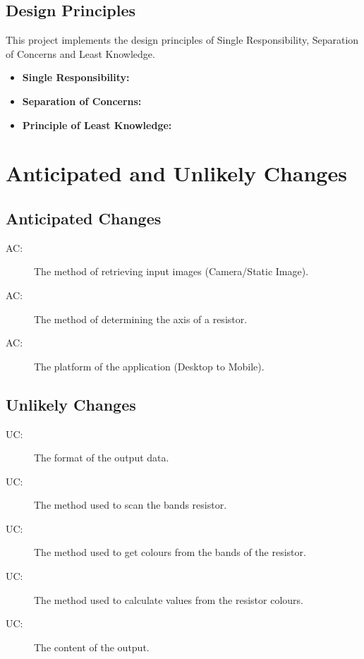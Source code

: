 \documentclass[12pt, titlepage]{article}
\newcounter{acnum}
\newcommand{\actheacnum}{AC\theacnum}
\newcounter{ucnum}
\newcommand{\uctheucnum}{UC\theucnum}
\begin{document}
\subsection{Design Principles}
This project implements the design principles of Single Responsibility, Separation of Concerns and Least Knowledge.
\begin{itemize}
\item \textbf{Single Responsibility:} 
\item \textbf{Separation of Concerns:}
\item \textbf{Principle of Least Knowledge:}
\end{itemize}

\section{Anticipated and Unlikely Changes} \label{SecChange}

\subsection{Anticipated Changes} \label{SecAchange}
\begin{description}
\item[ \actheacnum \label{acInput}:] The method of retrieving input images (Camera/Static Image).
\item[ \actheacnum \label{acAxis}:] The method of determining the axis of a resistor.
\item[ \actheacnum \label{acPlatform}:] The platform of the application (Desktop to Mobile).
\end{description}

\subsection{Unlikely Changes} \label{SecUchange}
\begin{description}
\item[ \uctheucnum \label{ucIO}:] The format of the output data.
\item[ \uctheucnum \label{ucInput}:] The method used to scan the bands resistor.
\item[ \uctheucnum \label{ucInput}:] The method used to get colours from the bands of the resistor.
\item[ \uctheucnum \label{ucInput}:] The method used to calculate values from the resistor colours.
\item[ \uctheucnum \label{ucInput}:] The content of the output.
\end{description}
\end{document}
